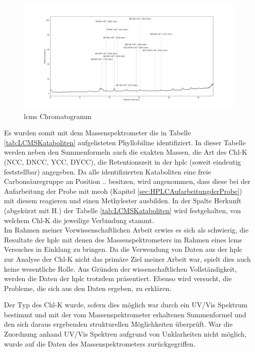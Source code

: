 \begin{figure}[!htbp]
  \includegraphics[width=\textwidth]{figures/Kapitel6/keineReaktion/Kuerbis_Analyse_keineReaktion2_Ganzes_Spektrum.png}
  \caption[LC-MS Chromatogramm, Quelle: Author]{\gls{lcms} Chromatogramm}
  \label{fig:LCMSChromatogramm}
\end{figure}

Es wurden somit mit dem Massenspektrometer die in Tabelle \ref{tab:LCMSKataboliten} aufgelisteten Phyllobiline identifiziert. In dieser Tabelle werden neben den Summenformeln auch die exakten Massen, die Art des \gls{Chl-K} (NCC, DNCC, YCC, DYCC), die Retentionszeit in der \gls{hplc} (soweit eindeutig feststellbar) angegeben. Da alle identifizierten Kataboliten eine freie Carbonsäuregruppe an Position .. besitzen, wird angenommen, dass diese bei der Aufarbeitung der Probe mit \gls{meoh} (Kapitel \ref{sec:HPLCAufarbeitungderProbe}) mit diesem reagieren und einen Methylester ausbilden. In der Spalte Herkunft (abgekürzt mit H.) der Tabelle \ref{tab:LCMSKataboliten} wird festgehalten, von welchem \gls{Chl-K} die jeweilige Verbindung stammt. \\

Im Rahmen meiner Vorwissenschaftlichen Arbeit erwies es sich als schwierig, die Resultate der \gls{hplc} mit denen des Massenspektrometers im Rahmen eines \gls{lcms} Versuches in Einklang zu bringen. Da die Verwendung von Daten aus der \gls{hplc} zur Analyse der \gls{Chl-K} nicht das primäre Ziel meiner Arbeit war, spielt dies auch keine wesentliche Rolle. Aus Gründen der wissenschaftlichen Vollständigkeit, werden die Daten der \gls{hplc} trotzdem präsentiert. Ebenso wird versucht, die Probleme, die sich aus den Daten ergeben, zu erklären.

Der Typ des \gls{Chl-K} wurde, sofern dies möglich war durch ein UV/Vis Spektrum bestimmt und mit der vom Massenspektrometer erhaltenen Summenformel und den sich daraus ergebenden strukturellen Möglichkeiten überprüft. War die Zuordnung anhand UV/Vis Spektren aufgrund von Unklarheiten nicht möglich, wurde auf die Daten des Massenspektrometers zurückgegriffen.\\

